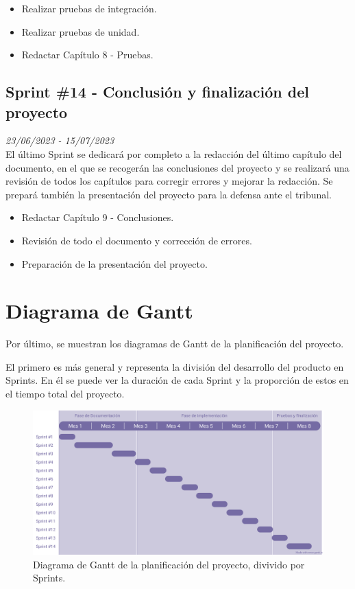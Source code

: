 \begin{itemize}
    \item Realizar pruebas de integración.
    \item Realizar pruebas de unidad.
    \item Redactar Capítulo 8 - Pruebas.
\end{itemize}

\subsection{Sprint \#14 - Conclusión y finalización del proyecto}
\textit{23/06/2023   -   15/07/2023}\\

El último Sprint se dedicará por completo a la redacción del último capítulo del documento, en el que se recogerán las conclusiones del proyecto y se realizará una revisión
de todos los capítulos para corregir errores y mejorar la redacción. Se prepará también la presentación del proyecto para la defensa ante el tribunal.
\begin{itemize}
    \item Redactar Capítulo 9 - Conclusiones.
    \item Revisión de todo el documento y corrección de errores.
    \item Preparación de la presentación del proyecto.
\end{itemize}


\section{Diagrama de Gantt}
Por último, se muestran los diagramas de Gantt de la planificación del proyecto. 


El primero es más general y representa la división del desarrollo del producto en Sprints.
En él se puede ver la duración de cada Sprint y la proporción de estos en el tiempo total del proyecto. 

\begin{figure}[H]
    \centering
    \centerline{\includegraphics[width=1\textwidth]{imagenes/c4/gantt.png}}
    \caption{Diagrama de Gantt de la planificación del proyecto, divivido por Sprints.}
    \label{fig:diagrama_gantt}
\end{figure}


